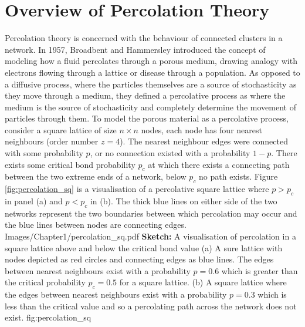 \section{Overview of Percolation Theory}
\label{Sec: Percolation Theory}
Percolation theory is concerned with the behaviour of connected clusters in a network. In 1957, Broadbent and Hammersley\cite{broadbent1957} introduced the concept of modeling how a fluid percolates through a porous medium, drawing analogy with electrons flowing through a lattice or disease through a population. As opposed to a diffusive process, where the particles themselves are a source of stochasticity as they move through a medium, they defined a percolative process as where the medium is the source of stochasticity and completely determine the movement of particles through them\cite{broadbent1957}. To model the porous material as a percolative process, consider a square lattice of size $n\times n $ nodes, each node has four nearest neighbours (order number $z=4$). The nearest neighbour edges were connected with some probability $p$, or no connection existed with a probability $1-p$. There exists some critical bond probability $p_c$ at which there exists a connecting path between the two extreme ends of a network, below $p_c$ no path exists. Figure \ref{fig:percolation_sq} is a visualisation of a percolative square lattice where $p>p_c$ in panel (a) and $p<p_c$ in (b). The thick blue lines on either side of the two networks represent the two boundaries between which percolation may occur and the blue lines between nodes are connecting edges.
{Images/Chapter1/percolation_sq.pdf}
{\textbf{Sketch:} A visualisation of percolation in a square lattice above and below the critical bond value}
{(a) A sure lattice with nodes depicted as red circles and connecting edges as blue lines. The edges between nearest neighbours exist with a probability $p = 0.6$ which is greater than the critical probability $p_c = 0.5$ for a square lattice\cite{pike1974}. (b) A square lattice where the edges between nearest neighbours exist with a probability $p = 0.3$ which is less than the critical value and so a percolating path across the network does not exist.}
{fig:percolation_sq}

